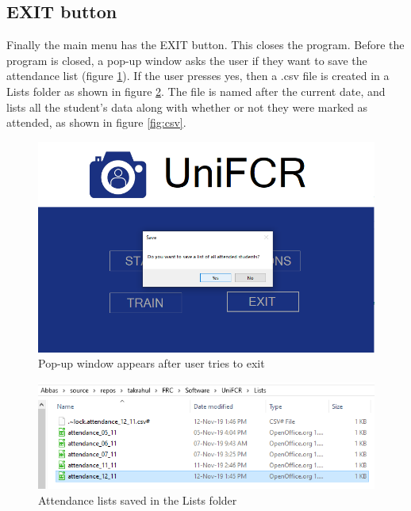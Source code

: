 \documentclass[12pt, a4paper]{article}
\begin{document}
\subsection{EXIT button}
Finally the main menu has the EXIT button. This closes the program. Before the program is closed, a pop-up window asks the user if they want to save the attendance list (figure \ref{fig:popup}). If the user presses yes, then a .csv file is created in a Lists folder as shown in figure \ref{fig:folder}. The file is named after the current date, and lists all the student’s data along with whether or not they were marked as attended, as shown in figure \ref{fig:csv}.
\begin{figure}[h!]
\begin{center}
	\centering
		\includegraphics[width=1.0\columnwidth]{images/popup}
	\caption{Pop-up window appears after user tries to exit}
	\label{fig:popup}
\end{center}
\end{figure}
\begin{figure}[h!]
\begin{center}
	\centering
		\includegraphics[width=1.0\columnwidth]{images/folder}
	\caption{Attendance lists saved in the Lists folder}
	\label{fig:folder}
\end{center}
\end{figure}
\end{document}
